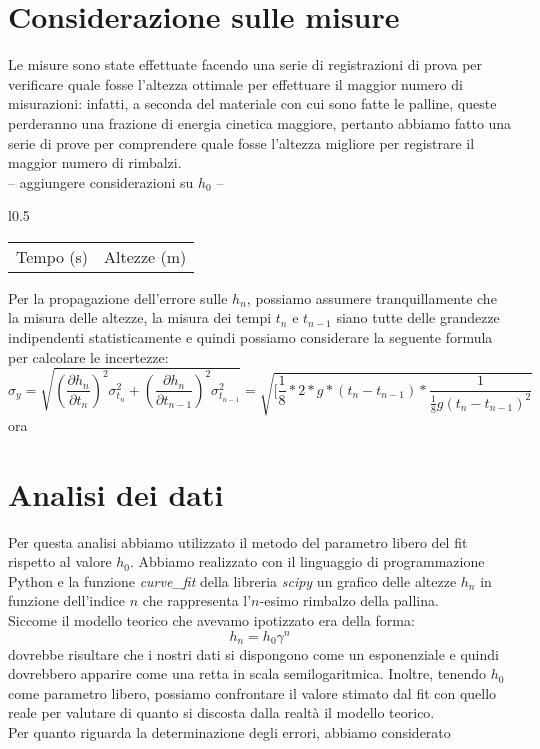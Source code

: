 \documentclass{article}
\begin{document}
\section{Considerazione sulle misure}
Le misure sono state effettuate facendo una serie di registrazioni di prova per verificare quale fosse l'altezza ottimale per effettuare il maggior numero di misurazioni: infatti, a seconda del materiale con cui sono fatte le palline, queste perderanno una frazione di energia cinetica maggiore, pertanto abbiamo fatto una serie di prove per comprendere quale fosse l'altezza migliore per registrare il maggior numero di rimbalzi. \\
-- aggiungere considerazioni su $h_0$ -- 
\begin{wraptable}{l}{0.5\textwidth}
	\centering
	\begin{tabular}{c  c}
		\toprule
		\multirow[c]{2}{*}{Tempo (s)} & \multirow[c]{2}{*}{Altezze (m)} \\ \\
		\toprule
		
	\end{tabular}
\end{wraptable}

\noindent Per la propagazione dell'errore sulle $h_n$, possiamo assumere tranquillamente che la misura delle altezze, la misura dei tempi $t_n$ e $t_{n-1}$ siano tutte delle grandezze indipendenti statisticamente e quindi possiamo considerare la seguente formula per calcolare le incertezze:
\begin{equation}
	\sigma_y = \sqrt{\left(\frac{\partial{h_n}}{\partial{t_n}}\right)^2 \sigma_{t_n}^2 + \left(\frac{\partial{h_n}}{\partial{t_{n-1}}}\right)^2 \sigma_{t_{n-1}}^2} = \sqrt{[\frac{1}{8} * 2 * g * (t_n - t_{n-1}) * \frac{1}{\frac{1}{8}g(t_n - t_{n-1})^2}}
\end{equation}
ora 
\section{Analisi dei dati}

Per questa analisi abbiamo utilizzato il metodo del parametro libero del fit rispetto al valore $h_0$. Abbiamo realizzato con il linguaggio di programmazione Python e la funzione \emph{curve\_fit} della libreria \emph{scipy} un grafico delle altezze $h_n$ in funzione dell'indice $n$ che rappresenta l'$n$-esimo rimbalzo della pallina. \\
Siccome il modello teorico che avevamo ipotizzato era della forma:
$$
	h_n = h_0 \gamma^n
$$
dovrebbe risultare che i nostri dati si dispongono come un esponenziale e quindi dovrebbero apparire come una retta in scala semilogaritmica. Inoltre,  tenendo $h_0$ come parametro libero, possiamo confrontare il valore stimato dal fit con quello reale per valutare di quanto si discosta dalla realtà il modello teorico. \\
Per quanto riguarda la determinazione degli errori, abbiamo considerato 	
\end{document}

